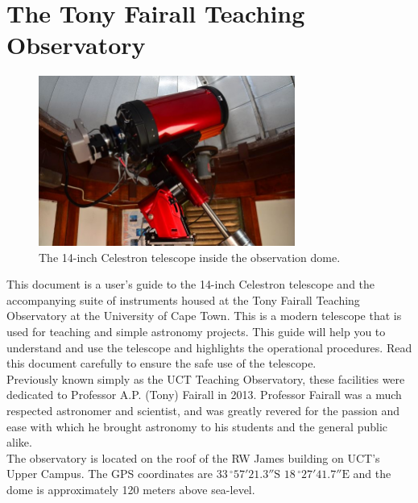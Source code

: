 \documentclass[12pt,twoside,a4paper]{report}
\begin{document}
\tableofcontents
\vspace{-10mm}





\chapter{The Tony Fairall Teaching Observatory}

\begin{figure}[ht]
 \centering
    \includegraphics[width=0.75\textwidth]{documentation_images/telescope.jpg}
    \caption{\label{fig:telescope}The 14-inch Celestron telescope inside the observation dome.}
\end{figure}

This document is a user's guide to the 14-inch Celestron telescope and the accompanying suite of instruments housed at the Tony Fairall Teaching Observatory at the University of Cape Town. This is a modern telescope that is used for teaching and simple astronomy projects. This guide will 
help you to understand and use the telescope and highlights the operational procedures. Read this document
carefully to ensure the safe use of the telescope.\\

Previously known simply as the UCT Teaching Observatory, these facilities were dedicated to Professor A.P. (Tony) Fairall in 2013. Professor Fairall was a much respected astronomer and scientist, and was greatly revered for the passion and ease with which he brought astronomy to his students and the general public alike.\\

The observatory is located on the roof of the RW James building on UCT's Upper Campus. The GPS coordinates are $33 \,^{\circ}57'21.3''\mathrm{S}$ $18\,^{\circ}27'41.7''\mathrm{E}$ and the dome is approximately 120 meters above sea-level.\\
\end{document}
